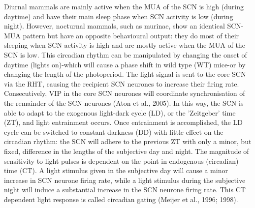 \begin{multicols}{2}
Diurnal mammals are mainly active when the MUA of the SCN is high (during daytime) and have their main sleep phase when SCN activity is low (during night). However, nocturnal mammals, such as murinae, show an identical SCN-MUA pattern but have an opposite behavioural output: they do most of their sleeping when SCN activity is high and are mostly active when the MUA of the SCN is low. This circadian rhythm can be manipulated by changing the onset of daytime (lights on)-which will cause a phase shift in wild type (WT) mice-or by changing the length of the photoperiod. The light signal is sent to the core SCN via the RHT, causing the recipient SCN neurones to increase their firing rate. Consecutively, VIP in the core SCN neurones will coordinate synchronisation of the remainder of the SCN neurones (Aton et al., 2005). In this way, the SCN is able to adapt to the exogenous light-dark cycle (LD), or the 'Zeitgeber' time (ZT), and light entrainment occurs. Once entrainment is accomplished, the LD cycle can be switched to constant darkness (DD) with little effect on the circadian rhythm: the SCN will adhere to the previous ZT with only a minor, but fixed, difference in the lengths of the subjective day and night. The magnitude of sensitivity to light pulses is dependent on the point in endogenous (circadian) time (CT). A light stimulus given in the subjective day will cause a minor increase in SCN neurone firing rate, while a light stimulus during the subjective night will induce a substantial increase in the SCN neurone firing rate. This CT dependent light response is called circadian gating (Meijer et al., 1996; 1998).


\end{multicols}
